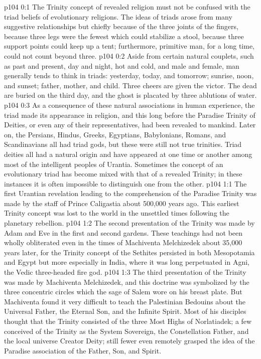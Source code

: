 \author{Melchizedek}
\vs p104 0:1 The Trinity concept of revealed religion must not be confused with the triad beliefs of evolutionary religions. The ideas of triads arose from many suggestive relationships but chiefly because of the three joints of the fingers, because three legs were the fewest which could stabilize a stool, because three support points could keep up a tent; furthermore, primitive man, for a long time, could not count beyond three.
\vs p104 0:2 Aside from certain natural couplets, such as past and present, day and night, hot and cold, and male and female, man generally tends to think in triads: yesterday, today, and tomorrow; sunrise, noon, and sunset; father, mother, and child. Three cheers are given the victor. The dead are buried on the third day, and the ghost is placated by three ablutions of water.
\vs p104 0:3 As a consequence of these natural associations in human experience, the triad made its appearance in religion, and this long before the Paradise Trinity of Deities, or even any of their representatives, had been revealed to mankind. Later on, the Persians, Hindus, Greeks, Egyptians, Babylonians, Romans, and Scandinavians all had triad gods, but these were still not true trinities. Triad deities all had a natural origin and have appeared at one time or another among most of the intelligent peoples of Urantia. Sometimes the concept of an evolutionary triad has become mixed with that of a revealed Trinity; in these instances it is often impossible to distinguish one from the other.
\vs p104 1:1 The first Urantian revelation leading to the comprehension of the Paradise Trinity was made by the staff of Prince Caligastia about 500,000 years ago. This earliest Trinity concept was lost to the world in the unsettled times following the planetary rebellion.
\vs p104 1:2 The second presentation of the Trinity was made by Adam and Eve in the first and second gardens. These teachings had not been wholly obliterated even in the times of Machiventa Melchizedek about 35,000 years later, for the Trinity concept of the Sethites persisted in both Mesopotamia and Egypt but more especially in India, where it was long perpetuated in Agni, the Vedic three\hyp{}headed fire god.
\vs p104 1:3 The third presentation of the Trinity was made by Machiventa Melchizedek, and this doctrine was symbolized by the three concentric circles which the sage of Salem wore on his breast plate. But Machiventa found it very difficult to teach the Palestinian Bedouins about the Universal Father, the Eternal Son, and the Infinite Spirit. Most of his disciples thought that the Trinity consisted of the three Most Highs of Norlatiadek; a few conceived of the Trinity as the System Sovereign, the Constellation Father, and the local universe Creator Deity; still fewer even remotely grasped the idea of the Paradise association of the Father, Son, and Spirit.
